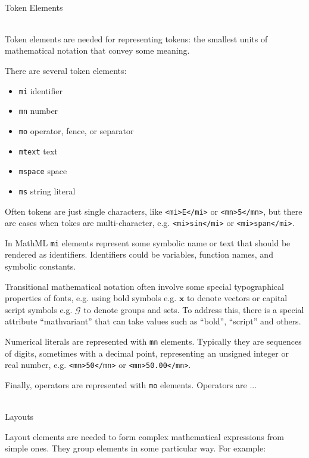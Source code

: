 \ \\


Token Elements

\ \\

Token elements are needed for representing tokens: the smallest units of
mathematical notation that convey some meaning.

There are several token elements:

\begin{itemize}
\itemsep1pt\parskip0pt
\item
  \texttt{mi} identifier
\item
  \texttt{mn} number
\item
  \texttt{mo} operator, fence, or separator
\item
  \texttt{mtext} text
\item
  \texttt{mspace} space
\item
  \texttt{ms} string literal
\end{itemize}

Often tokens are just single characters, like
\texttt{<mi>E</mi>} or
\texttt{<mn>5</mn>}, but
there are cases when tokes are multi-character, e.g.
\texttt{<mi>sin</mi>} or
\texttt{<mi>span</mi>}.

In MathML \texttt{mi} elements represent some symbolic name or text that
should be rendered as identifiers. Identifiers could be variables,
function names, and symbolic constants.

Transitional mathematical notation often involve some special
typographical properties of fonts, e.g. using bold symbols e.g.
$\mathbf x$ to denote vectors or capital script symbols
e.g. $\mathcal G$ to denote groups and sets. To address
this, there is a special attribute ``mathvariant'' that can take values
such as ``bold'', ``script'' and others.

Numerical literals are represented with \texttt{mn} elements. Typically
they are sequences of digits, sometimes with a decimal point,
representing an unsigned integer or real number, e.g.
\texttt{<mn>50</mn>} or
\texttt{<mn>50.00</mn>}.

Finally, operators are represented with \texttt{mo} elements. Operators
are ...


\ \\

Layouts

Layout elements are needed to form complex mathematical expressions from
simple ones. They group elements in some particular way. For example:

